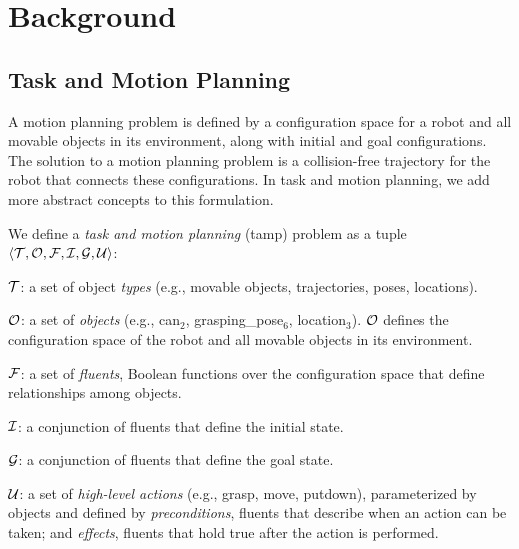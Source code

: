 \section{Background}
\subsection{Task and Motion Planning}

A motion planning problem is defined by a configuration space for a
robot and all movable objects in its environment, along with initial
and goal configurations. The solution to a motion planning problem is
a collision-free trajectory for the robot that connects these
configurations. In task and motion planning, we add more abstract
concepts to this formulation.


\begin{defn}
We define a \emph{task and motion planning} ({\sc tamp}) problem as a tuple
$\langle \mathcal{T}, \mathcal{O}, \mathcal{F}, \mathcal{I}, \mathcal{G}, \mathcal{U} \rangle$:
\begin{tightlist}
\item $\mathcal{T}$: a set of object \emph{types} (e.g., movable objects,
  trajectories, poses, locations).

\item $\mathcal{O}$: a set of \emph{objects} (e.g., can$_{2}$, grasping\_pose$_{6}$, location$_{3}$).
  $\mathcal{O}$ defines the configuration space of the robot and all movable objects in its environment.

\item $\mathcal{F}$: a set of \emph{fluents}, Boolean functions over the configuration
  space that define relationships among objects.

\item $\mathcal{I}$: a conjunction of fluents that define the initial state.

\item $\mathcal{G}$: a conjunction of fluents that define the goal state.

\item $\mathcal{U}$: a set of \emph{high-level actions} (e.g., grasp, move,
  putdown), parameterized by objects and defined by
  \emph{preconditions}, fluents that describe when an action
  can be taken; and \emph{effects}, fluents that hold true
  after the action is performed.
\end{tightlist}
\end{defn}

